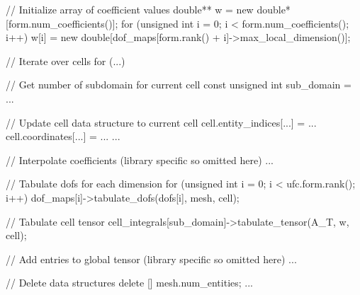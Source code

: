 \begin{code}
{  // Initialize array of coefficient values
  double** w = new double*[form.num_coefficients()];
  for (unsigned int i = 0; i < form.num_coefficients(); i++)
    w[i] = new double[dof_maps[form.rank() + i]->max_local_dimension()];

  // Iterate over cells
  for (...)
  {
    // Get number of subdomain for current cell
    const unsigned int sub_domain = ...

    // Update cell data structure to current cell
    cell.entity_indices[...] = ...
    cell.coordinates[...] = ...
    ...

    // Interpolate coefficients (library specific so omitted here)
    ...

    // Tabulate dofs for each dimension
    for (unsigned int i = 0; i < ufc.form.rank(); i++)
      dof_maps[i]->tabulate_dofs(dofs[i], mesh, cell);

    // Tabulate cell tensor
    cell_integrals[sub_domain]->tabulate_tensor(A_T, w, cell);

    // Add entries to global tensor (library specific so omitted here)
    ...
  }

  // Delete data structures
  delete [] mesh.num_entities;
  ...
}
\end{code}
\normalsize
